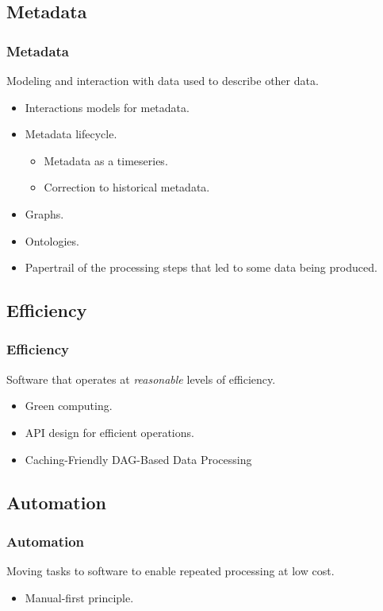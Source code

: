 \subsection{Metadata}
\begin{frame}
    \frametitle{Metadata}
    \vspace{0mm}
    Modeling and interaction with data used to describe other data.
    \vspace{3mm}
    \begin{itemize}
        \item Interactions models for metadata.
        \item Metadata lifecycle.
          \begin{itemize}
            \item Metadata as a timeseries.
            \item Correction to historical metadata.
          \end{itemize}
        \item Graphs.
        \item Ontologies.
        \item Papertrail of the processing steps that led to some data being produced.
    \end{itemize}
\end{frame}

\subsection{Efficiency}
\begin{frame}
    \frametitle{Efficiency}
    \vspace{0mm}
    Software that operates at \textsl{reasonable} levels of efficiency.
    \vspace{3mm}
    \begin{itemize}
        \item Green computing.
        \item API design for efficient operations.
        \item Caching-Friendly DAG-Based Data Processing
    \end{itemize}
\end{frame}

\subsection{Automation}
\begin{frame}
    \frametitle{Automation}
    \vspace{0mm}
    Moving tasks to software to enable repeated processing at low cost.
    \vspace{3mm}
    \begin{itemize}
        \item Manual-first principle.
    \end{itemize}
\end{frame}

